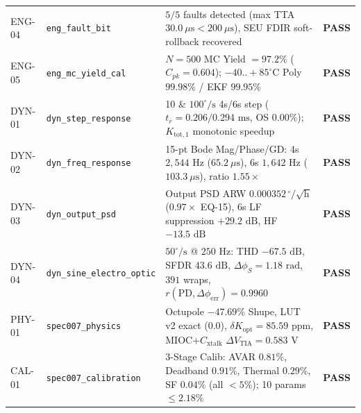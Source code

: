 \documentclass[11pt,a4paper]{article}
\begin{document}
\begin{tabularx}{\textwidth}{@{}l l X c@{}}
ENG-04 & \texttt{eng\_fault\_bit} & $5/5$ faults detected (max TTA $30.0\ \mu\text{s} < 200\ \mu\text{s}$), SEU FDIR soft-rollback recovered & \textcolor{TealDark}{\textbf{PASS}} \\
ENG-05 & \texttt{eng\_mc\_yield\_cal} & $N=500$ MC Yield $= 97.2\%$ ($C_{pk}=0.604$); $-40..+85^\circ\text{C}$ Poly $99.98\%$ / EKF $99.95\%$ & \textcolor{TealDark}{\textbf{PASS}} \\
DYN-01 & \texttt{dyn\_step\_response} & 10 \& $100^\circ/\text{s}$ 4s/6s step ($t_r=0.206/0.294\text{ ms}$, OS $0.00\%$); $K_{\text{tot},1}$ monotonic speedup & \textcolor{TealDark}{\textbf{PASS}} \\
DYN-02 & \texttt{dyn\_freq\_response} & 15-pt Bode Mag/Phase/GD: 4s $2{,}544\text{ Hz}$ ($65.2\ \mu\text{s}$), 6s $1{,}642\text{ Hz}$ ($103.3\ \mu\text{s}$), ratio $1.55\times$ & \textcolor{TealDark}{\textbf{PASS}} \\
DYN-03 & \texttt{dyn\_output\_psd} & Output PSD ARW $0.000352\,^\circ/\sqrt{\text{h}}$ ($0.97\times$ EQ-15), 6s LF suppression $+29.2\text{ dB}$, HF $-13.5\text{ dB}$ & \textcolor{TealDark}{\textbf{PASS}} \\
DYN-04 & \texttt{dyn\_sine\_electro\_optic} & $50^\circ/\text{s}$ @ $250\text{ Hz}$: THD $-67.5\text{ dB}$, SFDR $43.6\text{ dB}$, $\Delta\phi_S=1.18\text{ rad}$, $391$ wraps, $r(\text{PD},\Delta\phi_{\text{err}})=0.9960$ & \textcolor{TealDark}{\textbf{PASS}} \\
PHY-01 & \texttt{spec007\_physics} & Octupole $-47.69\%$ Shupe, LUT v2 exact ($0.0$), $\delta K_{\text{opt}}=85.59\text{ ppm}$, MIOC+$C_{\text{xtalk}}$ $\Delta V_{\text{TIA}}=0.583\text{ V}$ & \textcolor{TealDark}{\textbf{PASS}} \\
CAL-01 & \texttt{spec007\_calibration} & 3-Stage Calib: AVAR $0.81\%$, Deadband $0.91\%$, Thermal $0.29\%$, SF $0.04\%$ (all $<5\%$); 10 params $\le 2.18\%$ & \textcolor{TealDark}{\textbf{PASS}} \\
\bottomrule
\end{tabularx}
\normalsize
\end{document}
